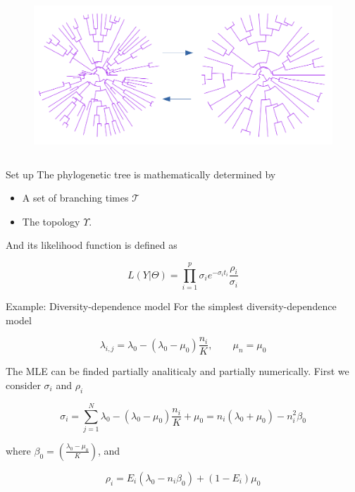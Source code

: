 \documentclass[11pt]{beamer}
\begin{document}
\begin{frame}
\begin{columns}
\begin{column}{0.5\textwidth}
      \begin{figure}
                    \includegraphics[width=0.85\linewidth]{figures/treesa.png}
                 
				\end{figure}
\end{column}
\end{columns}






\end{frame}

\begin{frame}{Set up}
The phylogenetic tree is mathematically determined by

\begin{itemize}
	\item A set of branching times $\mathcal{T}$%
	\item The topology  $\Upsilon$.%
\end{itemize}

And its likelihood function is defined as 

	\begin{equation} L( Y | \Theta) = \displaystyle\prod_{i=1}^p \sigma_i e^{-\sigma_i t_i} \frac{\rho_{i}}{\sigma_i}  
 		\label{llik}
 		\end{equation}
 		
\end{frame}

\begin{frame}{Example: Diversity-dependence model}
For the simplest diversity-dependence model 

$$ \lambda_{i,j} = \lambda_0 - (\lambda_0 - \mu_0)\frac{n_i}{K}, \qquad \mu_n = \mu_0 $$ 

The MLE can be finded partially analiticaly and partially numerically. \pause First we consider $\sigma_i$ and $\rho_i$ 

$$ \sigma_i  = \sum_{j=1}^{N}  \lambda_0 - (\lambda_0 - \mu_0)\frac{n_i}{K} + \mu_0 
 		 = n_i(\lambda_0 + \mu_0) - n_i^2\beta_0 $$

where $ \beta_0=\left(\frac{\lambda_0-\mu_0}{K}\right)$, and

$$\rho_i = E_i(\lambda_0 - n_i\beta_0)+(1-E_i)\mu_0$$
\end{frame}
\end{document}
